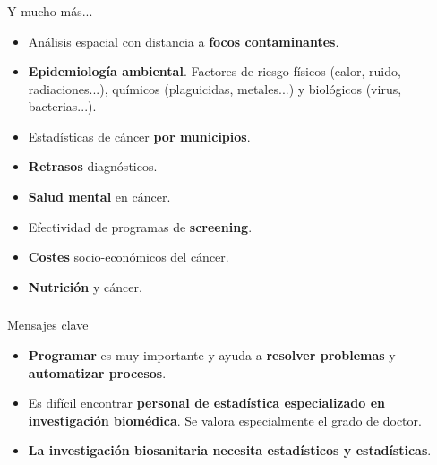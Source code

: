 \documentclass{beamer}
\begin{document}
\begin{frame}\frametitle{}
	
	\begin{block}{Y mucho más...}
		\begin{itemize}
			\item Análisis espacial con distancia a \textbf{focos contaminantes}.
			\item \textbf{Epidemiología ambiental}. Factores de riesgo físicos (calor, ruido, radiaciones...), químicos (plaguicidas, metales...) y biológicos (virus, bacterias...).
			\item Estadísticas de cáncer \textbf{por municipios}.
			\item \textbf{Retrasos} diagnósticos.
			\item \textbf{Salud mental} en cáncer.
			\item Efectividad de programas de \textbf{screening}.
			\item \textbf{Costes} socio-económicos del cáncer.
			\item \textbf{Nutrición} y cáncer.
		\end{itemize}
	\end{block}

\end{frame}


\begin{frame}\frametitle{}
	
	\begin{block}{Mensajes clave}
		\begin{itemize}
			\item \textbf{Programar} es muy importante y ayuda a \textbf{resolver problemas} y \textbf{automatizar procesos}.\\[2ex]
			\item Es difícil encontrar \textbf{personal de estadística especializado en investigación biomédica}. Se valora especialmente el grado de doctor.\\[2ex]
			\item \textbf{La investigación biosanitaria necesita estadísticos y estadísticas}.\\[2ex]
		\end{itemize}
	\end{block}
	
\end{frame}
\end{document}
